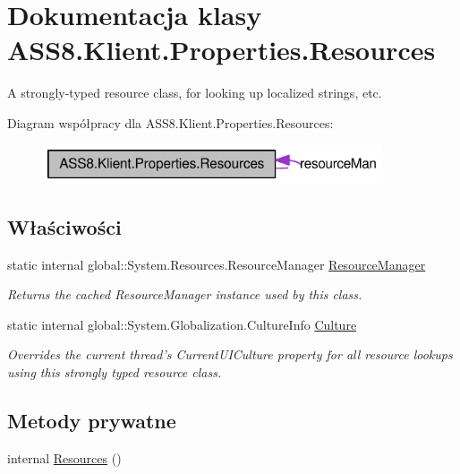\hypertarget{a00022}{
\section{Dokumentacja klasy ASS8.Klient.Properties.Resources}
\label{d7/de0/a00022}
}
A strongly-typed resource class, for looking up localized strings, etc.  


Diagram współpracy dla ASS8.Klient.Properties.Resources:\nopagebreak
\begin{figure}[H]
\begin{center}
\leavevmode
\includegraphics[width=284pt]{dd/d52/a00221}
\end{center}
\end{figure}
\subsection*{Właściwości}
\begin{CompactItemize}
\item 
static internal global::System.Resources.ResourceManager \hyperlink{a00022_f756a9c764abf399cb2712c4e3585d68}{ResourceManager}
\begin{CompactList}\small\item\em Returns the cached ResourceManager instance used by this class. \item\end{CompactList}\item 
static internal global::System.Globalization.CultureInfo \hyperlink{a00022_a857477b89977c77ae86ed5d16ecc759}{Culture}
\begin{CompactList}\small\item\em Overrides the current thread's CurrentUICulture property for all resource lookups using this strongly typed resource class. \item\end{CompactList}\end{CompactItemize}
\subsection*{Metody prywatne}
\begin{CompactItemize}
\item 
internal \hyperlink{a00022_282497759bf2ecca8387e2523d57c2de}{Resources} ()
\end{CompactItemize}
